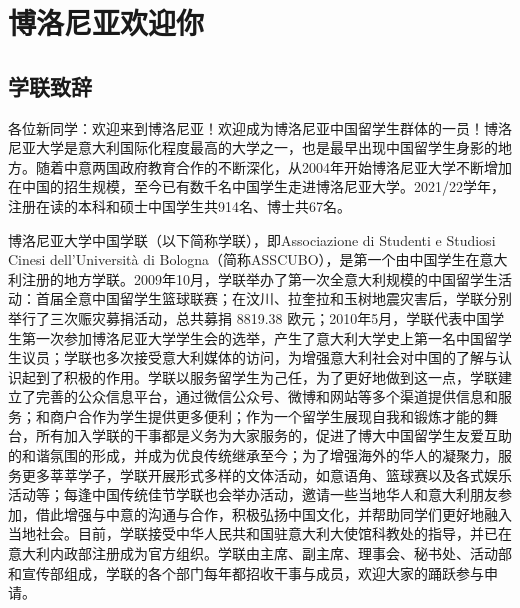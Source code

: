 
% 


\chapter{博洛尼亚欢迎你}                 %

\section{学联致辞}

各位新同学：欢迎来到博洛尼亚！欢迎成为博洛尼亚中国留学生群体的一员！博洛尼亚大学是意大利国际化程度最高的大学之一，也是最早出现中国留学生身影的地方。随着中意两国政府教育合作的不断深化，从2004年开始博洛尼亚大学不断增加在中国的招生规模，至今已有数千名中国学生走进博洛尼亚大学。2021/22学年，注册在读的本科和硕士中国学生共914名、博士共67名。

博洛尼亚大学中国学联（以下简称学联），即Associazione di Studenti e Studiosi Cinesi dell'Università di Bologna（简称ASSCUBO），是第一个由中国学生在意大利注册的地方学联。2009年10月，学联举办了第一次全意大利规模的中国留学生活动：首届全意中国留学生篮球联赛；在汶川、拉奎拉和玉树地震灾害后，学联分别举行了三次赈灾募捐活动，总共募捐 8819.38 欧元；2010年5月，学联代表中国学生第一次参加博洛尼亚大学学生会的选举，产生了意大利大学史上第一名中国留学生议员；学联也多次接受意大利媒体的访问，为增强意大利社会对中国的了解与认识起到了积极的作用。学联以服务留学生为己任，为了更好地做到这一点，学联建立了完善的公众信息平台，通过微信公众号、微博和网站等多个渠道提供信息和服务；和商户合作为学生提供更多便利；作为一个留学生展现自我和锻炼才能的舞台，所有加入学联的干事都是义务为大家服务的，促进了博大中国留学生友爱互助的和谐氛围的形成，并成为优良传统继承至今；为了增强海外的华人的凝聚力，服务更多莘莘学子，学联开展形式多样的文体活动，如意语角、篮球赛以及各式娱乐活动等；每逢中国传统佳节学联也会举办活动，邀请一些当地华人和意大利朋友参加，借此增强与中意的沟通与合作，积极弘扬中国文化，并帮助同学们更好地融入当地社会。目前，学联接受中华人民共和国驻意大利大使馆科教处的指导，并已在意大利内政部注册成为官方组织。学联由主席、副主席、理事会、秘书处、活动部和宣传部组成，学联的各个部门每年都招收干事与成员，欢迎大家的踊跃参与申请。

